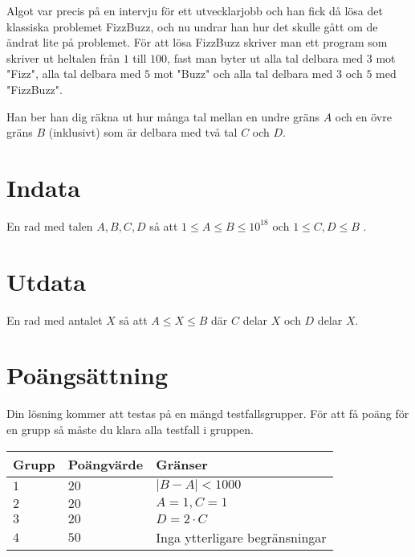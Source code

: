 \noindent
Algot var precis på en intervju för ett utvecklarjobb och han fick då lösa det klassiska problemet FizzBuzz, och nu undrar han hur det skulle gått om de ändrat lite på problemet. För att lösa FizzBuzz skriver man ett program som skriver ut heltalen från $1$ till $100$, fast man byter ut alla tal delbara med $3$ mot "Fizz", alla tal delbara med $5$ mot "Buzz" och alla tal delbara med $3$ och $5$ med "FizzBuzz". 

\noindent
Han ber han dig räkna ut hur många tal mellan en undre gräns $A$ och en övre gräns $B$ (inklusivt) som är delbara med två tal $C$ och $D$.
\section*{Indata}
\noindent
En rad med talen $A, B, C, D$ så att \(1 \leq A \leq B \leq 10^{18}\) och \(1 \leq C, D \leq B\) .
\section*{Utdata}
\noindent
En rad med antalet $X$ så att $A \le X \le B$ där $C$ delar $X$ och $D$ delar $X$.
\section*{Poängsättning}
\noindent
Din lösning kommer att testas på en mängd testfallsgrupper.
För att få poäng för en grupp så måste du klara alla testfall i gruppen.

\noindent
\begin{tabular}{| l | l | l |}
\hline
  Grupp & Poängvärde & Gränser \\ \hline
  $1$    & $20$       &  $|B-A| < 1000$ \\ \hline 
  $2$    & $20$       &  $A = 1, C = 1$ \\ \hline
  $3$    & $20$       &  $D = 2 \cdot C$ \\ \hline
  $4$    & $50$       &  Inga ytterligare begränsningar \\ \hline
\end{tabular}
